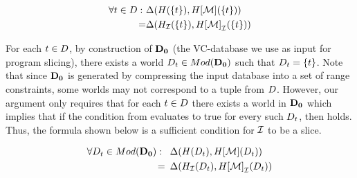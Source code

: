 \begin{align}
  \label{eq:tuple-level-slice-test}
  \begin{split}
    \forall t \in D:\,\, &\Delta(H(\{t\}),H[\mathcal{M}](\{t\}))\\ = &\Delta({H}_{\mathcal{I}}(\{t\}),{H[\mathcal{M}]}_{\mathcal{I}}(\{t\}))
  \end{split}
\end{align}




For each $t \in D$, by construction of $\mathbf{D_0}$ (the VC-database we use as input for program slicing), there exists a world  $D_{t} \in Mod({\mathbf{D_0}})$ such that $D_{t} = \{t\}$. Note that since $\mathbf{D_0}$ is generated by compressing the input database into a set of range constraints, some worlds may not correspond to a tuple from $D$. However, our argument only requires that for each $t \in D$ there exists a world in $\mathbf{D_0}$ which implies that if the condition from  evaluates to true for every such $D_{t}$, then  holds. Thus, the formula shown below is a sufficient condition for $\mathcal{I}$ to be a slice.

\begin{align}
  \label{eq:single-inst-slice-test}
  \begin{split}
    \forall D_{t} \in Mod({\mathbf{D_0}}):\,\, &\,\,\,\Delta(H(D_{t}),H[\mathcal{M}](D_{t}))\\ = &\,\,\,\Delta({H}_{\mathcal{I}}(D_{t}),{H[\mathcal{M}]}_{\mathcal{I}}(D_{t}))
  \end{split}
\end{align}

